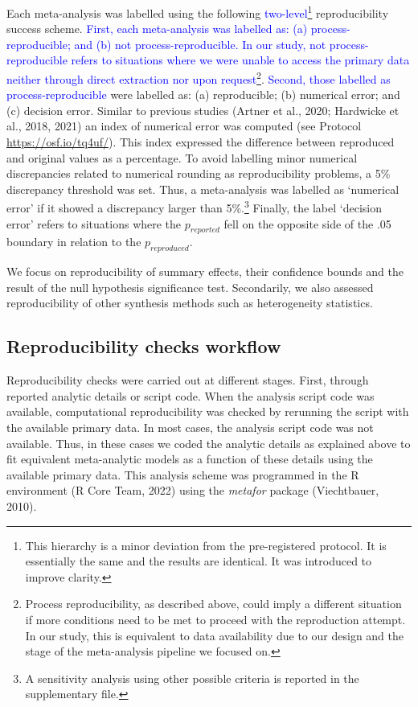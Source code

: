 \documentclass[
  ,man,floatsintext]{apa6}
\begin{document}
Each meta-analysis was labelled using the following \textcolor{blue}{two-level}\footnote{This hierarchy is a minor deviation from the pre-registered protocol. It is essentially the same and the results are identical. It was introduced to improve clarity.} reproducibility success scheme. \textcolor{blue}{First, each meta-analysis was labelled as: (a) process-reproducible; and (b) not process-reproducible. In our study, not process-reproducible refers to situations where we were unable to access the primary data neither through direct extraction nor upon request}\footnote{Process reproducibility, as described above, could imply a different situation if more conditions need to be met to proceed with the reproduction attempt. In our study, this is equivalent to data availability due to our design and the stage of the meta-analysis pipeline we focused on.}. \textcolor{blue}{Second, those labelled as process-reproducible} were labelled as: (a) reproducible; (b) numerical error; and (c) decision error. Similar to previous studies (Artner et al., 2020; Hardwicke et al., 2018, 2021) an index of numerical error was computed (see Protocol \url{https://osf.io/tq4uf/}). This index expressed the difference between reproduced and original values as a percentage. To avoid labelling minor numerical discrepancies related to numerical rounding as reproducibility problems, a 5\% discrepancy threshold was set. Thus, a meta-analysis was labelled as `numerical error' if it showed a discrepancy larger than 5\%.\footnote{A sensitivity analysis using other possible criteria is reported in the supplementary file.}
Finally, the label `decision error' refers to situations where the \(p_{reported}\) fell on the opposite side of the .05 boundary in relation to the \(p_{reproduced}\).

We focus on reproducibility of summary effects, their confidence bounds and the result of the null hypothesis significance test. Secondarily, we also assessed reproducibility of other synthesis methods such as heterogeneity statistics.

\hypertarget{reproducibility-checks-workflow}{%
\subsection{Reproducibility checks workflow}\label{reproducibility-checks-workflow}}

Reproducibility checks were carried out at different stages. First, through reported analytic details or script code. When the analysis script code was available, computational reproducibility was checked by rerunning the script with the available primary data. In most cases, the analysis script code was not available. Thus, in these cases we coded the analytic details as explained above to fit equivalent meta-analytic models as a function of these details using the available primary data. This analysis scheme was programmed in the R environment (R Core Team, 2022) using the \emph{metafor} package (Viechtbauer, 2010).
\end{document}
